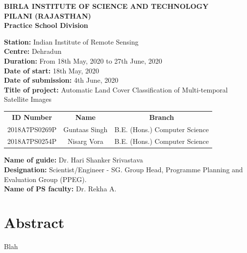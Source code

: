 \documentclass[12pt, a4paper]{report}
\begin{document}
\begin{center}  
\textbf {BIRLA INSTITUTE OF SCIENCE AND TECHNOLOGY\\
PILANI (RAJASTHAN)\\
Practice School Division}
\end{center}
\begin{onehalfspace}
\textbf{Station:} Indian Institute of Remote Sensing \\
\textbf{Centre:} Dehradun\\
\textbf{Duration:} From 18th May, 2020 to 27th June, 2020 \\
\textbf{Date of start:} 18th May, 2020 \\
\textbf{Date of submission:} 4th June, 2020 \\
\textbf{Title of project:} Automatic Land Cover Classification of Multi-temporal Satellite Images
\begin{center}
\begin{tabular}{c c c}
\textbf{ID Number} & \textbf{Name} & \textbf{Branch} \\
2018A7PS0269P & Guntaas Singh & B.E. (Hons.) Computer Science \\
2018A7PS0254P & Nisarg Vora  & B.E. (Hons.) Computer Science \\
\end{tabular} 
\end{center}
\textbf{Name of guide:} Dr. Hari Shanker Srivastava \\
\textbf{Designation:} Scientist/Engineer - SG. Group Head, Programme Planning and Evaluation Group (PPEG). \\
\textbf{Name of PS faculty:} Dr. Rekha A. 

	\section{Abstract}
	\paragraph{}
	Blah
\end{onehalfspace}
\newpage
\end{document}
